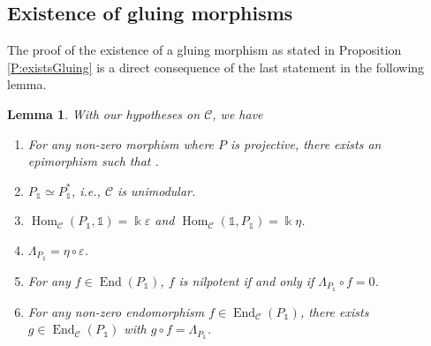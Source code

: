 \documentclass[10pt,a4paper]{amsart}
\newtheorem{lemma}{Lemma}
\numberwithin{equation}{section}
\newcommand{\tto}{\xrightarrow}
\numberwithin{theorem}{section}
\numberwithin{proposition}{section}
\numberwithin{definition}{section}
\numberwithin{lemma}{section}
\numberwithin{corollary}{section}
\numberwithin{remark}{section}
\numberwithin{example}{section}
\newcommand{\cat}{\mathcal{C}}
\newcommand{\End}{\operatorname{End}}
\newcommand{\Hom}{\operatorname{Hom}}
\newcommand{\unit}{\ensuremath{\mathds{1}}}
\newcommand{\FK}{{\Bbbk}}
\newcommand{\ve}{\varepsilon}
\newcommand{\wt}{\widetilde}
\begin{document}
\subsection{Existence of gluing morphisms} \label{ss:gluing}
The proof of the existence of a gluing morphism as stated in Proposition
\ref{P:existsGluing} is a direct consequence of the last statement in
the following lemma.

\begin{lemma}\label{L:prop-proj}\samepage
 With our
 hypotheses
 on $\cat$, we have
 \begin{enumerate}\itemsep=0pt
 \item[$1.$] For any non-zero morphism \smash{$P\tto f\unit$} where $P$ is
 projective, there exists
 an
 epimorphism \smash{$\wt f\colon P\to P_\unit$}
 such that
 \smash{$f=\ve\circ\wt f$}.
 \item[$2.$]
 $P_\unit\simeq P_\unit^*$, i.e., $\cat$ is unimodular.
 \item[$3.$] $\Hom_\cat(P_\unit,\unit)=\FK\ve$ and $\Hom_\cat(\unit,P_\unit)=\FK\eta$.
 \item[$4.$] $\Lambda_{P_\unit}=\eta\circ\ve$.
 \item[$5.$] For any $f\in\End(P_\unit)$, $f$ is nilpotent if and only if
 $\Lambda_{P_\unit}\circ f=0$.
 \item[$6.$] For any non-zero endomorphism $f\in \End_\cat(P_\unit)$, there exists
 $g\in \End_\cat(P_\unit)$ with $g\circ f=\Lambda_{P_\unit}$.
 \end{enumerate}
\end{lemma}
\end{document}
